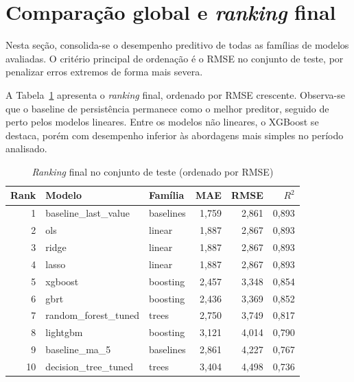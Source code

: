 \section{Comparação global e \textit{ranking} final}
\label{sec:cap6_ranking}

Nesta seção, consolida-se o desempenho preditivo de todas as famílias de modelos
avaliadas. O critério principal de ordenação é o RMSE no conjunto de teste, por
penalizar erros extremos de forma mais severa.

A Tabela~\ref{tab:cap6_ranking_test} apresenta o \textit{ranking} final, ordenado
por RMSE crescente. Observa-se que o baseline de persistência permanece como o
melhor preditor, seguido de perto pelos modelos lineares. Entre os modelos não
lineares, o XGBoost se destaca, porém com desempenho inferior às abordagens mais
simples no período analisado.

\begin{table}[H]
\centering
\caption{\textit{Ranking} final no conjunto de teste (ordenado por RMSE)}
\label{tab:cap6_ranking_test}
\footnotesize
\begin{tabular}{rllrrr}
\toprule
Rank & Modelo & Família & MAE & RMSE & $R^2$ \\
\midrule
 1 & baseline\_last\_value  & baselines & 1{,}759 & 2{,}861 & 0{,}893 \\
 2 & ols                    & linear    & 1{,}887 & 2{,}867 & 0{,}893 \\
 3 & ridge                  & linear    & 1{,}887 & 2{,}867 & 0{,}893 \\
 4 & lasso                  & linear    & 1{,}887 & 2{,}867 & 0{,}893 \\
 5 & xgboost                & boosting  & 2{,}457 & 3{,}348 & 0{,}854 \\
 6 & gbrt                   & boosting  & 2{,}436 & 3{,}369 & 0{,}852 \\
 7 & random\_forest\_tuned  & trees     & 2{,}750 & 3{,}749 & 0{,}817 \\
 8 & lightgbm               & boosting  & 3{,}121 & 4{,}014 & 0{,}790 \\
 9 & baseline\_ma\_5        & baselines & 2{,}861 & 4{,}227 & 0{,}767 \\
10 & decision\_tree\_tuned  & trees     & 3{,}404 & 4{,}498 & 0{,}736 \\
\bottomrule
\end{tabular}
\end{table}

